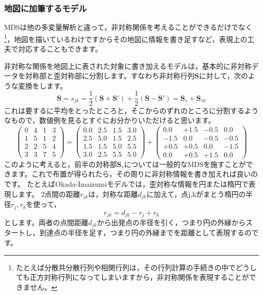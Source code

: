 \documentclass{ltjsbook}
\begin{document}
\subsubsection{地図に加筆するモデル}
MDSは他の多変量解析と違って，非対称関係を考えることができるだけでなく\footnote{たとえば分散共分散行列や相関行列は，その行列計算の手続きの中でどうしても正方対称行列になってしまいますから，非対称関係を表現することができません。}，地図を描いているわけですからその地図に情報を書き足すなど，表現上の工夫で対応することもできます。

非対称な関係を地図上に表された対象に書き加えるモデルは，基本的に非対称データを対称部と歪対称部に分割します。すなわち非対称行列$\bm{S}$に対して，次のような変換をします。
\[ \bm{S} = s_{jk} = \frac{1}{2}(\bm{S}+\bm{S}') + \frac{1}{2}(\bm{S}-\bm{S}')= \bm{S}_s + \bm{S}_{sk} \]
これは要するに平均をとったところと，そこからのずれのところに分割するようなもので，数値例を見るとすぐにお分かりいただけると思います。
\[ \begin{pmatrix} 0 & 4 & 1 & 3 \\
                1 & 5 & 1 & 2 \\
                2 & 2 & 5 & 4 \\
                3 & 3 & 7 & 5\end{pmatrix} =
	\begin{pmatrix} 0.0 & 2.5 & 1.5 & 3.0 \\ 2.5 & 5.0 & 1.5 & 2.5 \\ 1.5 & 1.5 & 5.0 & 5.5\\3.0 & 2.5 & 5.5 & 5.0 \end{pmatrix}
	+
	\begin{pmatrix} 0.0 & +1.5 & -0.5 & 0.0 \\ -1.5 & 0.0 & -0.5 & -0.5 \\ +0.5 & +0.5 & 0.0 & -1.5 \\ 0.0 & +0.5 & +1.5 & 0.0 \end{pmatrix}
\]
このように考えると，前半の対称部$\bm{S}_s$については一般的なMDSを施すことができます。これで布置が得られたら，その周りに非対称情報を書き加えれば良いのです。
たとえばOkada-Imaizumiモデル\parencite{okada1987nonmetric,okada1997asymmetric}では，歪対称な情報を円または楕円で表現します。
2点間の距離$r_{jk}$は，対称な距離$d_{jk}$に加えて，点j,kがまとう楕円の半径$r_j,r_k$を使って，
\[ r_{jk} = d_{jk} -r_j + r_k \]
とします。両者の点間距離$d_{jk}$から出発点の半径を引く，つまり円の外縁からスタートし，到達点の半径を足す，つまり円の外縁までを距離として表現するのです。
\end{document}
